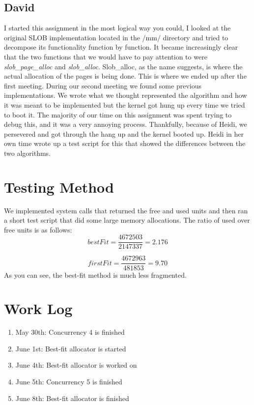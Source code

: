 \documentclass{article}
\begin{document}
\subsection{David}
I started this assignment in the most logical way you could, I looked at the original SLOB 
implementation located in the /mm/ directory and tried to decompose its functionality function
by function. It became increasingly clear that the two functions that we would have to pay
attention to were \textit{slob\_page\_alloc} and  \textit{slob\_alloc}. Slob\_alloc, as the 
name suggests, is where the actual allocation of the pages is being done. This is where we
ended up after the first meeting. During our second meeting we found some previous 
implementations. We wrote what we thought represented the algorithm and how it was meant to be
implemented but the kernel got hung up every time we tried to boot it. The majority of our time
on this assignment was spent trying to debug this, and it was a very annoying process. 
Thankfully, because of Heidi, we persevered and got through the hang up and the kernel booted
up. Heidi in her own time wrote up a test script for this that showed the differences between
the two algorithms.


\section{Testing Method}
We implemented system calls that returned the free and used units and then ran a short test script that did some large memory allocations. The ratio of used over free units is as follows: \\
\[ bestFit = \frac{4672503}{2147337} = 2.176 \]

\[ firstFit = \frac{4672963}{481853} = 9.70 \]
As you can see, the best-fit method is much less fragmented.

\section{Work Log}
\begin{enumerate}
\item May 30th: Concurrency 4 is finished
\item June 1st: Best-fit allocator is started
\item June 4th: Best-fit allocator is worked on
\item June 5th: Concurrency 5 is finished
\item June 8th: Best-fit allocator is finished
\end{enumerate}
\end{document}
